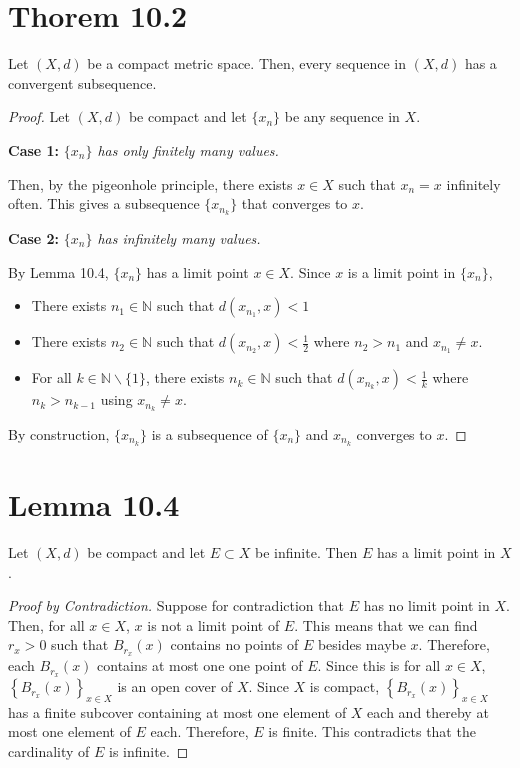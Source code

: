 \documentclass[11pt]{article}
\begin{document}
\newcommand{\seq}[2][n]{\ensuremath{\left\{ #2 _{#1} \right\}}}
\section{Thorem 10.2}
    Let $(X,d)$ be a compact metric space. 
    Then, every sequence in $(X,d)$ has a convergent subsequence.
    \begin{proof}
        Let $(X,d)$ be compact and let $\{x_n\}$ be any sequence in $X$.

        \textbf{Case 1:} \textit{$\{x_n\}$ has only finitely many values.}

            Then, by the pigeonhole principle, there exists $x \in X$ such that $x_n = x$ infinitely often.
            This gives a subsequence $\{x_{n_k}\}$ that converges to $x$.

        \textbf{Case 2:} \textit{$\{x_n\}$ has infinitely many values.}

            By Lemma 10.4, $\{x_n\}$ has a limit point $x \in X$.
            Since $x$ is a limit point in $\{x_n\}$, 
            \begin{itemize}
                \item   There exists $n_1 \in \mathbb{N}$ such that $d(x_{n_1},x) < 1$
                \item   There exists $n_2 \in \mathbb{N}$ such that $d(x_{n_2},x) < \frac{1}{2}$ where $n_2 > n_1$ and $x_{n_1} \neq x$.
                \item   For all $k \in \mathbb{N} \backslash \{1\}$, there exists $n_k \in \mathbb{N}$ such that $d(x_{n_k},x) < \frac{1}{k}$ where $n_k > n_{k-1}$ using $x_{n_k} \neq x$.
            \end{itemize}
            By construction, $\{x_{n_k}\}$ is a subsequence of $\{x_n\}$ and $x_{n_k}$ converges to $x$.
    \end{proof}

\section{Lemma 10.4}
    Let $(X,d)$ be compact and let $E \subset X$ be infinite.
    Then $E$ has a limit point in $X$.
    \begin{proof}[Proof by Contradiction]
        Suppose for contradiction that $E$ has no limit point in $X$.
        Then, for all $x \in X$, $x$ is not a limit point of $E$.
        This means that we can find $r_x > 0$ such that $B_{r_x}(x)$ contains no points of $E$ besides maybe $x$.
        Therefore, each $B_{r_x}(x)$ contains at most one one point of $E$.
        Since this is for all $x \in X$, $\left\{ B_{r_x}(x) \right\}_{x \in X}$ is an open cover of $X$.
        Since $X$ is compact, $\left\{ B_{r_x}(x) \right\}_{x \in X}$ has a finite subcover containing at most one element of $X$ each and thereby at most one element of $E$ each.
        Therefore, $E$ is finite.
        This contradicts that the cardinality of $E$ is infinite.
    \end{proof}
\end{document}
